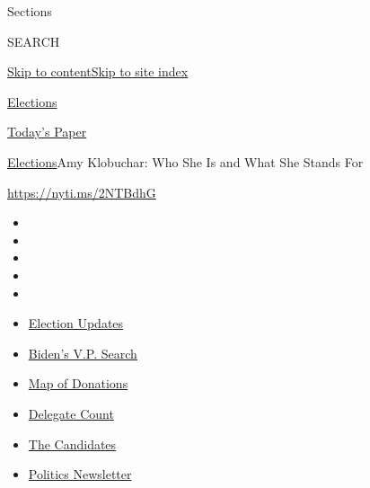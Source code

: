 Sections

SEARCH

\protect\hyperlink{site-content}{Skip to
content}\protect\hyperlink{site-index}{Skip to site index}

\href{https://www.nytimes.com/news-event/2020-election}{Elections}

\href{https://myaccount.nytimes.com/auth/login?response_type=cookie\&client_id=vi}{}

\href{https://www.nytimes.com/section/todayspaper}{Today's Paper}

\href{/news-event/2020-election}{Elections}\textbar{}Amy Klobuchar: Who
She Is and What She Stands For

\url{https://nyti.ms/2NTBdhG}

\begin{itemize}
\item
\item
\item
\item
\item
\end{itemize}

\begin{itemize}
\item
  \href{https://www.nytimes.com/2020/07/31/us/elections/biden-vs-trump.html?action=click\&pgtype=Article\&state=default\&region=TOP_BANNER\&context=storylines_menu}{Election
  Updates}
\item
  \href{https://www.nytimes.com/article/biden-vice-president-2020.html?action=click\&pgtype=Article\&state=default\&region=TOP_BANNER\&context=storylines_menu}{Biden's
  V.P. Search}
\item
  \href{https://www.nytimes.com/interactive/2020/07/24/us/politics/trump-biden-campaign-donors.html?action=click\&pgtype=Article\&state=default\&region=TOP_BANNER\&context=storylines_menu}{Map
  of Donations}
\item
  \href{https://www.nytimes.com/interactive/2020/us/elections/delegate-count-primary-results.html?action=click\&pgtype=Article\&state=default\&region=TOP_BANNER\&context=storylines_menu}{Delegate
  Count}
\item
  \href{https://www.nytimes.com/interactive/2019/us/politics/2020-presidential-candidates.html?action=click\&pgtype=Article\&state=default\&region=TOP_BANNER\&context=storylines_menu}{The
  Candidates}
\item
  \href{https://www.nytimes.com/newsletters/politics?action=click\&pgtype=Article\&state=default\&region=TOP_BANNER\&context=storylines_menu}{Politics
  Newsletter}
\end{itemize}

